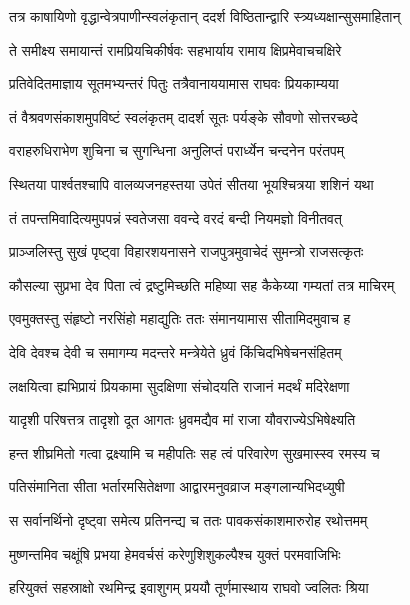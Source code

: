 \twolineshloka
{तत्र काषायिणो वृद्धान्वेत्रपाणीन्स्वलंकृतान्}
{ददर्श विष्ठितान्द्वारि स्त्र्यध्यक्षान्सुसमाहितान्} %

\twolineshloka
{ते समीक्ष्य समायान्तं रामप्रियचिकीर्षवः}
{सहभार्याय रामाय क्षिप्रमेवाचचक्षिरे} %

\twolineshloka
{प्रतिवेदितमाज्ञाय सूतमभ्यन्तरं पितुः}
{तत्रैवानाययामास राघवः प्रियकाम्यया} %

\twolineshloka
{तं वैश्रवणसंकाशमुपविष्टं स्वलंकृतम्}
{दादर्श सूतः पर्यङ्के सौवणो सोत्तरच्छदे} %

\twolineshloka
{वराहरुधिराभेण शुचिना च सुगन्धिना}
{अनुलिप्तं परार्ध्येन चन्दनेन परंतपम्} %

\twolineshloka
{स्थितया पार्श्वतश्चापि वालव्यजनहस्तया}
{उपेतं सीतया भूयश्चित्रया शशिनं यथा} %

\twolineshloka
{तं तपन्तमिवादित्यमुपपन्नं स्वतेजसा}
{ववन्दे वरदं बन्दी नियमज्ञो विनीतवत्} %

\twolineshloka
{प्राञ्जलिस्तु सुखं पृष्ट्वा विहारशयनासने}
{राजपुत्रमुवाचेदं सुमन्त्रो राजसत्कृतः} %

\twolineshloka
{कौसल्या सुप्रभा देव पिता त्वं द्रष्टुमिच्छति}
{महिष्या सह कैकेय्या गम्यतां तत्र माचिरम्} %

\twolineshloka
{एवमुक्तस्तु संहृष्टो नरसिंहो महाद्युतिः}
{ततः संमानयामास सीतामिदमुवाच ह} %

\twolineshloka
{देवि देवश्च देवी च समागम्य मदन्तरे}
{मन्त्रेयेते ध्रुवं किंचिदभिषेचनसंहितम्} %

\twolineshloka
{लक्षयित्वा ह्यभिप्रायं प्रियकामा सुदक्षिणा}
{संचोदयति राजानं मदर्थं मदिरेक्षणा} %

\twolineshloka
{यादृशी परिषत्तत्र तादृशो दूत आगतः}
{ध्रुवमद्यैव मां राजा यौवराज्येऽभिषेक्ष्यति} %

\twolineshloka
{हन्त शीघ्रमितो गत्वा द्रक्ष्यामि च महीपतिः}
{सह त्वं परिवारेण सुखमास्स्व रमस्य च} %

\twolineshloka
{पतिसंमानिता सीता भर्तारमसितेक्षणा}
{आद्वारमनुवव्राज मङ्गलान्यभिदध्युषी} %

\twolineshloka
{स सर्वानर्थिनो दृष्ट्वा समेत्य प्रतिनन्द्य च}
{ततः पावकसंकाशमारुरोह रथोत्तमम्} %

\twolineshloka
{मुष्णन्तमिव चक्षूंषि प्रभया हेमवर्चसं}
{करेणुशिशुकल्पैश्च युक्तं परमवाजिभिः} %

\twolineshloka
{हरियुक्तं सहस्राक्षो रथमिन्द्र इवाशुगम्}
{प्रययौ तूर्णमास्थाय राघवो ज्वलितः श्रिया} %

